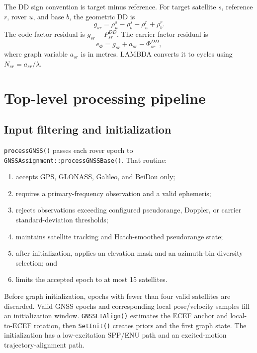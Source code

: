 \documentclass[11pt,a4paper]{article}
\newcommand{\code}[1]{\texttt{#1}}
\begin{document}
The DD sign convention is target minus reference.  For target satellite $s$,
reference $r$, rover $u$, and base $b$, the geometric DD is
\begin{equation}
g_{sr}=\rho_u^s-\rho_b^s-\rho_u^r+\rho_b^r.
\end{equation}
The code factor residual is $g_{sr}-P_{sr}^{DD}$.  The carrier factor residual
is
\begin{equation}
e_{\Phi}=g_{sr}+a_{sr}-\Phi_{sr}^{DD},
\end{equation}
where graph variable $a_{sr}$ is in metres.  LAMBDA converts it to cycles using
$N_{sr}=a_{sr}/\lambda$.

\section{Top-level processing pipeline}

\subsection{Input filtering and initialization}

\code{processGNSS()} passes each rover epoch to
\code{GNSSAssignment::processGNSSBase()}.  That routine:
\begin{enumerate}
  \item accepts GPS, GLONASS, Galileo, and BeiDou only;
  \item requires a primary-frequency observation and a valid ephemeris;
  \item rejects observations exceeding configured pseudorange, Doppler, or
        carrier standard-deviation thresholds;
  \item maintains satellite tracking and Hatch-smoothed pseudorange state;
  \item after initialization, applies an elevation mask and an azimuth-bin
        diversity selection; and
  \item limits the accepted epoch to at most 15 satellites.
\end{enumerate}

Before graph initialization, epochs with fewer than four valid satellites are
discarded.  Valid GNSS epochs and corresponding local pose/velocity samples fill
an initialization window.  \code{GNSSLIAlign()} estimates the ECEF anchor and
local-to-ECEF rotation, then \code{SetInit()} creates priors and the first graph
state.  The initialization has a low-excitation SPP/ENU path and an
excited-motion trajectory-alignment path.
\end{document}
